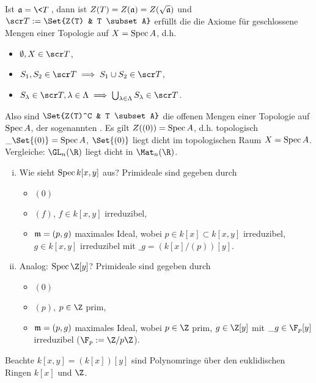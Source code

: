 \begin{ex}
\begin{enumerate}[(i)]
            Ist $\frk a = \<T\>$, dann ist $Z(T) = Z(\mathfrak{a}) = Z(\sqrt{\mathfrak{a}})$ und $\scr T := \Set{Z(T) & T \subset A}$ erfüllt die die Axiome für geschlossene Mengen einer Topologie auf $X = \operatorname{Spec} A$, d.h.
            \begin{itemize}
                \item
                    $\emptyset, X \in \scr T$,
                \item
                    $S_1, S_2 \in \scr T \implies S_1 \cup S_2 \in \scr T$,
                \item
                    $S_\lambda \in \scr T, \lambda \in \Lambda \implies \bigcup_{\lambda \in \Lambda} S_\lambda \in \scr T$.
            \end{itemize}
            Also sind $\Set{Z(T)^C & T \subset A}$ die offenen Mengen einer Topologie auf $\operatorname{Spec} A$, der sogenannten .
            Es gilt $Z((0)) = \operatorname{Spec} A$, d.h. topologisch $\_{\Set{(0)}} = \Spec A$, $\Set{(0)}$ liegt dicht im topologischen Raum $X = \operatorname{Spec} A$.
            Vergleiche: $\GL_n(\R)$ liegt dicht in $\Mat_n(\R)$.
    \end{enumerate}
\end{ex}

\begin{ex}
    \begin{enumerate}[(i)]
        \item
            Wie sieht $\operatorname{Spec} k[x,y]$ aus?
            Primideale sind gegeben durch
            \begin{itemize}
                \item
                    $(0)$
                \item
                    $(f)$, $f \in k[x,y]$ irreduzibel,
                \item
                    $\mathfrak{m} = (p, g)$ maximales Ideal, wobei $p \in k[x] \subset k[x,y]$ irreduzibel, $g \in k[x,y]$ irreduzibel mit $\_g = (k[x] / (p))[y]$.
            \end{itemize}
        \item
            Analog: $\Spec \Z[y]$?
            Primideale sind gegeben durch
            \begin{itemize}
                \item
                    $(0)$
                \item
                    $(p)$, $p \in \Z$ prim,
                \item
                    $\mathfrak{m} = (p,g)$ maximales Ideal, wobei $p \in \Z$ prim, $g \in \Z[y]$ mit $\_g \in \F_p[y]$ irreduzibel ($\F_p := \Z / p \Z$).

            \end{itemize}
    \end{enumerate}
    Beachte $k[x,y] = (k[x])[y]$ sind Polynomringe über den euklidischen Ringen $k[x]$ und $\Z$.
\end{ex}


